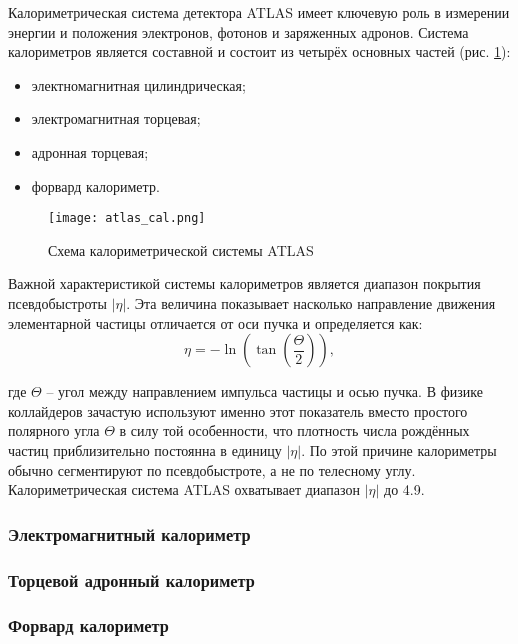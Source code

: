 Калориметрическая система детектора ATLAS имеет ключевую роль в измерении энергии и положения электронов, фотонов и заряженных адронов. Система калориметров является составной и состоит из четырёх основных частей \parencite{tdr_green} (рис. \ref{fig:atlas_cal}):
\begin {itemize}
    \item электномагнитная цилиндрическая;
    \item электромагнитная торцевая;
    \item адронная торцевая;
    \item форвард калориметр.
\end{itemize}\par
\begin{figure}[ht]
    \centering
    \texttt{[image: atlas\_cal.png]}
    \caption{Схема калориметрической системы ATLAS}
    \label{fig:atlas_cal}
\end{figure}
Важной характеристикой системы калориметров является диапазон покрытия псевдобыстроты $|\eta|$. Эта величина показывает насколько направление движения элементарной частицы отличается от оси пучка и определяется как:
\begin{equation}
    \eta = -\ln(\tan(\frac{\Theta}{2})),
\end{equation}\par
где $\Theta$ -- угол между направлением импульса частицы и осью пучка. В физике коллайдеров зачастую используют именно этот показатель вместо простого полярного угла $\Theta$ в силу той особенности, что плотность числа рождённых частиц приблизительно постоянна в единицу $|\eta|$. По этой причине калориметры обычно сегментируют по псевдобыстроте, а не по телесному углу. Калориметрическая система ATLAS охватывает диапазон $|\eta|$ до 4.9.

\subsubsection{Электромагнитный калориметр}


\subsubsection{Торцевой адронный калориметр}


\subsubsection{Форвард калориметр}

